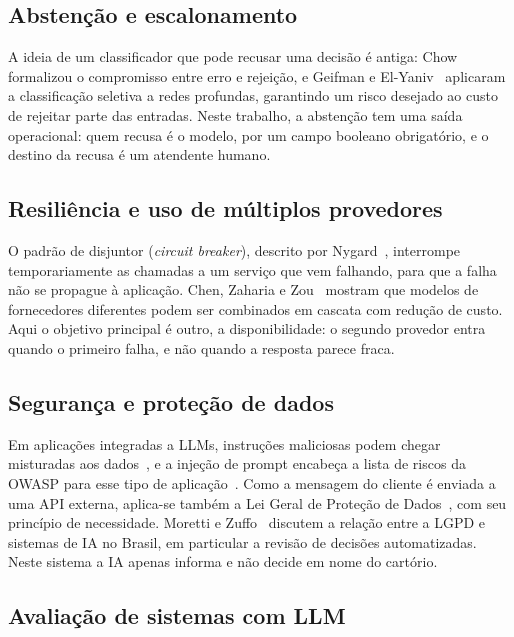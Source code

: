 \documentclass[conference]{IEEEtran}
\begin{document}
\subsection{Abstenção e escalonamento}

A ideia de um classificador que pode recusar uma decisão é antiga: Chow~\cite{chow1970} formalizou o compromisso entre erro e rejeição, e Geifman e El-Yaniv~\cite{geifman2017} aplicaram a classificação seletiva a redes profundas, garantindo um risco desejado ao custo de rejeitar parte das entradas. Neste trabalho, a abstenção tem uma saída operacional: quem recusa é o modelo, por um campo booleano obrigatório, e o destino da recusa é um atendente humano.

\subsection{Resiliência e uso de múltiplos provedores}

O padrão de disjuntor (\emph{circuit breaker}), descrito por Nygard~\cite{nygard2018}, interrompe temporariamente as chamadas a um serviço que vem falhando, para que a falha não se propague à aplicação. Chen, Zaharia e Zou~\cite{chen2024frugal} mostram que modelos de fornecedores diferentes podem ser combinados em cascata com redução de custo. Aqui o objetivo principal é outro, a disponibilidade: o segundo provedor entra quando o primeiro falha, e não quando a resposta parece fraca.

\subsection{Segurança e proteção de dados}

Em aplicações integradas a LLMs, instruções maliciosas podem chegar misturadas aos dados~\cite{greshake2023}, e a injeção de prompt encabeça a lista de riscos da OWASP para esse tipo de aplicação~\cite{owasp2025}. Como a mensagem do cliente é enviada a uma API externa, aplica-se também a Lei Geral de Proteção de Dados~\cite{lgpd}, com seu princípio de necessidade. Moretti e Zuffo~\cite{moretti2025} discutem a relação entre a LGPD e sistemas de IA no Brasil, em particular a revisão de decisões automatizadas. Neste sistema a IA apenas informa e não decide em nome do cartório.

\subsection{Avaliação de sistemas com LLM}
\end{document}
